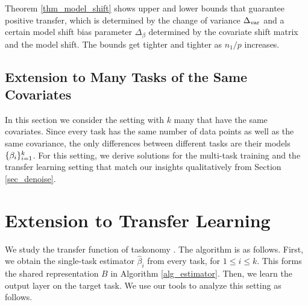 Theorem \ref{thm_model_shift} shows upper and lower bounds that guarantee positive transfer, which is determined by the change of variance $\Delta_{\text{var}}$ and a certain model shift bias parameter $\Delta_{\beta}$ determined by the covariate shift matrix and the model shift.
The bounds get tighter and tighter as $n_1 / p$ increases.


\subsection{Extension to Many Tasks of the Same Covariates}

In this section we consider the setting with $k$ many that have the same covariates.
Since every task has the same number of data points as well as the same covariance, the only differences between different tasks are their models $\{\beta_i\}_{i=1}^k$.
For this setting, we derive solutions for the multi-task training and the transfer learning setting that match our insights qualitatively from Section \ref{sec_denoise}.


\section{Extension to Transfer Learning}

We study the transfer function of taskonomy \cite{ZSSGM18}.
The algorithm is as follows.
First, we obtain the single-task estimator $\hat{\beta}_i$ from every task, for $1\le i \le k$.
This forms the shared representation $B$ in Algorithm \ref{alg_estimator}.
Then, we learn the output layer on the target task.
We use our tools to analyze this setting as follows.
